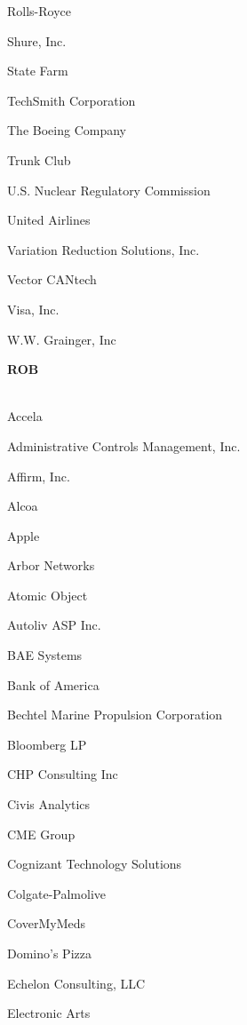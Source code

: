 \documentclass[twoside]{article}
\begin{document}
\begin{center}
\begin{multicols}{5}
\begin{FlushLeft}
\begin{compactitem}
\item Rolls-Royce
\item Shure, Inc.
\item State Farm
\item TechSmith Corporation
\item The Boeing Company
\item Trunk Club
\item U.S. Nuclear Regulatory Commission
\item United Airlines
\item Variation Reduction Solutions, Inc.
\item Vector CANtech
\item Visa, Inc.
\item W.W. Grainger, Inc
\end{compactitem}
        \end{FlushLeft}
        \vspace{1em}
        {\fontsize{14}{16}\selectfont \bf ROB}\\
        \vspace{-1em}
        ~\hrulefill~
        \vspace{-.9em}
        \begin{FlushLeft}
        \begin{compactitem}
        \item Accela
\item Administrative Controls Management, Inc.
\item Affirm, Inc.
\item Alcoa
\item Apple
\item Arbor Networks
\item Atomic Object
\item Autoliv ASP Inc.
\item BAE Systems
\item Bank of America
\item Bechtel Marine Propulsion Corporation
\item Bloomberg LP
\item CHP Consulting Inc
\item Civis Analytics
\item CME Group
\item Cognizant Technology Solutions
\item Colgate-Palmolive
\item CoverMyMeds
\item Domino's Pizza
\item Echelon Consulting, LLC
\item Electronic Arts

\end{compactitem}
\end{FlushLeft}
\end{multicols}
\end{center}
\end{document}
